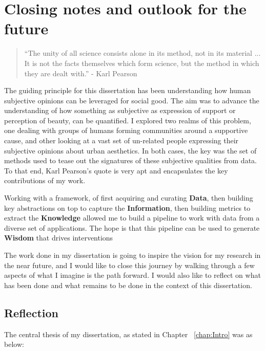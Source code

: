 \chapter{ Closing notes and outlook for the future }


\graphicspath{{Chapter6/plots/}}

\begin{quote}
    ``The unity of all science consists alone in its method, not in its material ... It is not the facts themselves which form science, but the method in which they are dealt with.'' - Karl Pearson
\end{quote}


The guiding principle for this dissertation has been understanding how human subjective opinions can be leveraged for social good. The aim was to advance the understanding of how something as subjective as expression of support or perception of beauty, can be quantified. 
I explored two realms of this problem, one dealing with groups of humans forming communities around a supportive cause, and other looking at a vast set of un-related people expressing their subjective opinions about urban aesthetics. In both cases, the key was the set of methods used to tease out the signatures of these subjective qualities from data. To that end, Karl Pearson's quote is very apt and encapsulates the key contributions of my work.

Working with a framework, of first acquiring and curating \textbf{Data}, then building key abstractions on top to capture the \textbf{Information}, then building metrics to extract the \textbf{Knowledge} allowed me to build a pipeline to work with data from a diverse set of applications. The hope is that this pipeline can be used to generate \textbf{Wisdom} that drives interventions

The work done in my dissertation is going to inspire the vision for my research in the near future, and I would like to close this journey by walking through a few aspects of what I imagine is the path forward. I would also like to reflect on what has been done and what remains to be done in the context of this dissertation.

\section{Reflection}
The central thesis of my dissertation, as stated in Chapter ~\ref{chap:Intro} was as below: 

